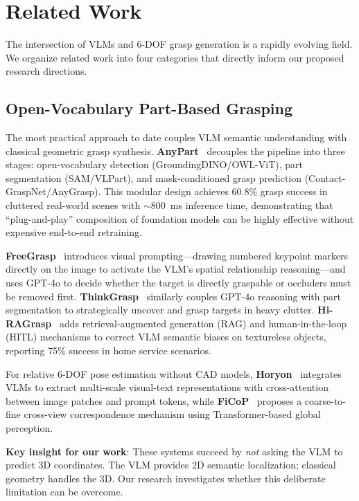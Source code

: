 \documentclass[11pt,a4paper]{article}
\begin{document}
\section{Related Work}

The intersection of VLMs and 6-DOF grasp generation is a rapidly evolving field. We organize related work into four categories that directly inform our proposed research directions.

\subsection{Open-Vocabulary Part-Based Grasping}

The most practical approach to date couples VLM semantic understanding with classical geometric grasp synthesis. \textbf{AnyPart}~\cite{anypart2024} decouples the pipeline into three stages: open-vocabulary detection (GroundingDINO/OWL-ViT), part segmentation (SAM/VLPart), and mask-conditioned grasp prediction (Contact-GraspNet/AnyGrasp). This modular design achieves 60.8\% grasp success in cluttered real-world scenes with $\sim$800~ms inference time, demonstrating that ``plug-and-play'' composition of foundation models can be highly effective without expensive end-to-end retraining.

\textbf{FreeGrasp}~\cite{freegrasp} introduces visual prompting---drawing numbered keypoint markers directly on the image to activate the VLM's spatial relationship reasoning---and uses GPT-4o to decide whether the target is directly graspable or occluders must be removed first. \textbf{ThinkGrasp}~\cite{qian2024thinkgrasp} similarly couples GPT-4o reasoning with part segmentation to strategically uncover and grasp targets in heavy clutter. \textbf{Hi-RAGrasp}~\cite{hiragrasp} adds retrieval-augmented generation (RAG) and human-in-the-loop (HITL) mechanisms to correct VLM semantic biases on textureless objects, reporting 75\% success in home service scenarios.

For relative 6-DOF pose estimation without CAD models, \textbf{Horyon}~\cite{horyon} integrates VLMs to extract multi-scale visual-text representations with cross-attention between image patches and prompt tokens, while \textbf{FiCoP}~\cite{ficop} proposes a coarse-to-fine cross-view correspondence mechanism using Transformer-based global perception.

\textbf{Key insight for our work}: These systems succeed by \textit{not} asking the VLM to predict 3D coordinates. The VLM provides 2D semantic localization; classical geometry handles the 3D. Our research investigates whether this deliberate limitation can be overcome.
\end{document}
